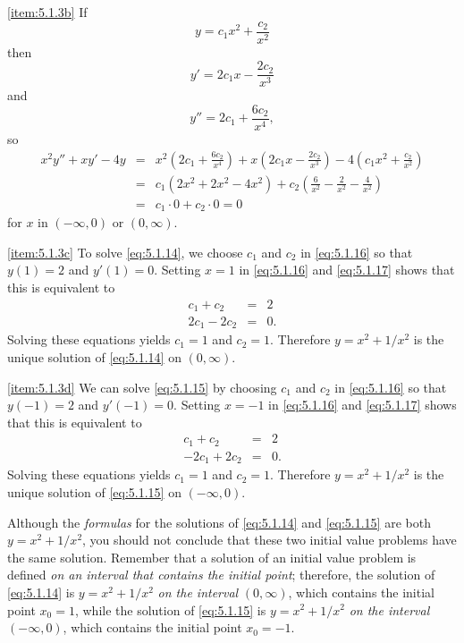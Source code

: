 \documentclass{ximera}
\begin{document}
\begin{example}
\begin{explanation}
\ref{item:5.1.3b} If
\begin{equation}\label{eq:5.1.16}
y=c_1x^2+\frac{c_2}{x^2}
\end{equation}
 then
\begin{equation}\label{eq:5.1.17}
y'=2c_1x-\frac{2c_2}{x^3}
\end{equation}
and
$$
y''=2c_1+\frac{6c_2}{x^4},
$$
so
\begin{eqnarray*}
x^2y''+xy'-4y&=&x^2\left(2c_1+\frac{6c_2}{x^4}\right)
+x\left(2c_1x-\frac{2c_2}{x^3}\right)
-4\left(c_1x^2+\frac{c_2}{x^2}\right)\\
&=&c_1(2x^2+2x^2-4x^2)
+c_2\left(\frac{6}{x^2}-\frac{2}{x^2}-\frac{4}{x^2}\right)
\\
&=&c_1\cdot0+c_2\cdot0=0
\end{eqnarray*}
for $x$ in $(-\infty,0)$ or $(0,\infty)$.

\ref{item:5.1.3c}
To solve
\eqref{eq:5.1.14}, we choose $c_1$ and $c_2$ in \eqref{eq:5.1.16}
so that $y(1)=2$ and $y'(1)=0$. Setting $x=1$ in \eqref{eq:5.1.16}
and \eqref{eq:5.1.17} shows that this is equivalent to
\begin{eqnarray*}
c_1+c_2&=&2\\
2c_1-2c_2&=&0.
\end{eqnarray*}
Solving these equations yields  $c_1=1$  and $c_2=1$.
Therefore $y=x^2+1/x^2$ is the unique  solution of \eqref{eq:5.1.14}
on $(0,\infty)$.

\ref{item:5.1.3d}
We can solve
\eqref{eq:5.1.15} by choosing $c_1$ and $c_2$ in \eqref{eq:5.1.16}
so that $y(-1)=2$ and $y'(-1)=0$. Setting $x=-1$ in \eqref{eq:5.1.16}
and \eqref{eq:5.1.17} shows that this is equivalent to
\begin{eqnarray*}
c_1+c_2&=&2\\
-2c_1+2c_2&=&0.
\end{eqnarray*}
Solving these equations yields  $c_1=1$  and $c_2=1$.
Therefore $y=x^2+1/x^2$ is the unique solution of \eqref{eq:5.1.15}
on $(-\infty,0)$.

\end{explanation}
\end{example}



Although the \textit{formulas} for the solutions of \eqref{eq:5.1.14} and
\eqref{eq:5.1.15} are both $y=x^2+1/x^2$, you should not conclude that
these two initial value problems have the same solution. Remember that
a solution of an initial value problem is defined \textit{on an interval
that contains the initial point};  therefore, the solution of
\eqref{eq:5.1.14} is $y=x^2+1/x^2$ \textit{on the interval} $(0,\infty)$,
which contains the initial point $x_0=1$, while the solution of
\eqref{eq:5.1.15} is $y=x^2+1/x^2$ \textit{on the interval} $(-\infty,0)$,
which contains the initial point $x_0=-1$.
\end{document}
